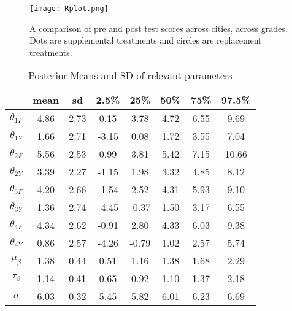 \documentclass{article}
\begin{document}
\begin{figure}[H]
\centering
\texttt{[image: Rplot.png]}
\caption{A comparison of pre and post test scores across cities, across grades. Dots are supplemental treatments and circles are replacement treatments.}
\label{deltat}
\end{figure}
\begin{table} [H]
\caption {Posterior Means and SD of relevant parameters}
\vspace{2mm}
\def\arraystretch{1.5}
\centering \begin{tabular}{c c c c c c c c} 
\hline\hline 
\vspace{1mm}
 & mean&  sd   & 2.5\%  &  25\% &   50\% &   75\% & 97.5\%\\  [0.5ex] \hline
 $\theta_{1F}$ &  4.86 & 2.73  &  0.15  &  3.78  &  4.72  &  6.55  &  9.69\\
 $\theta_{1Y}$ &  1.66 & 2.71  &  -3.15  &  0.08  &  1.72  &  3.55  &  7.04\\
 $\theta_{2F}$ &  5.56 & 2.53  &  0.99  &  3.81  &  5.42  &  7.15  &  10.66\\
 $\theta_{2Y}$&  3.39 & 2.27  &  -1.15  &  1.98  &  3.32  &  4.85  &  8.12\\
$\theta_{3F}$&  4.20 & 2.66 &  -1.54 &    2.52 &   4.31 &   5.93  &  9.10\\
 $\theta_{3Y}$&1.36 & 2.74  & -4.45 &  -0.37  &  1.50 &   3.17  &  6.55       \\
  $\theta_{4F}$&4.34  &2.62 &  -0.91 &   2.80  &  4.33 &   6.03  &  9.38\\
 $\theta_{4Y}$&0.86 & 2.57 &  -4.26 &  -0.79  &  1.02 &   2.57 &   5.74\\
$\mu_{\beta}$     &     1.38 &  0.44   & 0.51  &  1.16  &  1.38  &  1.68   & 2.29  \\
$\tau_{\beta}$     &     1.14 & 0.41   & 0.65  &  0.92  &  1.10   & 1.37  &  2.18  \\
$\sigma$               &     6.03 &  0.32  &  5.45 &   5.82  &  6.01  &  6.23  &  6.69 \\
\hline 
\end{tabular}
\end{table}
\end{document}

